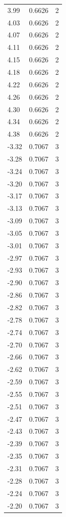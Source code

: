 \begin{longtable}{lrr}
  3.99 & 0.6626 & 2 \\
  4.03 & 0.6626 & 2 \\
  4.07 & 0.6626 & 2 \\
  4.11 & 0.6626 & 2 \\
  4.15 & 0.6626 & 2 \\
  4.18 & 0.6626 & 2 \\
  4.22 & 0.6626 & 2 \\
  4.26 & 0.6626 & 2 \\
  4.30 & 0.6626 & 2 \\
  4.34 & 0.6626 & 2 \\
  4.38 & 0.6626 & 2 \\
  -3.32 & 0.7067 & 3 \\
  -3.28 & 0.7067 & 3 \\
  -3.24 & 0.7067 & 3 \\
  -3.20 & 0.7067 & 3 \\
  -3.17 & 0.7067 & 3 \\
  -3.13 & 0.7067 & 3 \\
  -3.09 & 0.7067 & 3 \\
  -3.05 & 0.7067 & 3 \\
  -3.01 & 0.7067 & 3 \\
  -2.97 & 0.7067 & 3 \\
  -2.93 & 0.7067 & 3 \\
  -2.90 & 0.7067 & 3 \\
  -2.86 & 0.7067 & 3 \\
  -2.82 & 0.7067 & 3 \\
  -2.78 & 0.7067 & 3 \\
  -2.74 & 0.7067 & 3 \\
  -2.70 & 0.7067 & 3 \\
  -2.66 & 0.7067 & 3 \\
  -2.62 & 0.7067 & 3 \\
  -2.59 & 0.7067 & 3 \\
  -2.55 & 0.7067 & 3 \\
  -2.51 & 0.7067 & 3 \\
  -2.47 & 0.7067 & 3 \\
  -2.43 & 0.7067 & 3 \\
  -2.39 & 0.7067 & 3 \\
  -2.35 & 0.7067 & 3 \\
  -2.31 & 0.7067 & 3 \\
  -2.28 & 0.7067 & 3 \\
  -2.24 & 0.7067 & 3 \\
  -2.20 & 0.7067 & 3 \\

\end{longtable}
